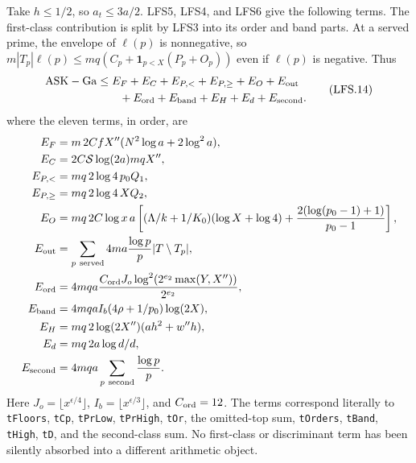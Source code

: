 Take $h\le1/2$, so $a_t\le3a/2$.  LFS5, LFS4, and LFS6
give the following terms.  The first-class contribution is split
by LFS3 into its order and band parts.  At a served prime, the
envelope of $\ell(p)$ is nonnegative, so
$m|T_p|\ell(p)\le mq(C_p+\mathbf1_{p<X}(P_p+O_p))$ even
if $\ell(p)$ is negative.  Thus
\begin{equation}
\begin{aligned}
 \mathrm{ASK}-\mathrm{Ga}
 &\le E_F+E_C+E_{P,<}+E_{P,\ge}+E_O+E_{\rm out}\\
 &\qquad{}+E_{\rm ord}+E_{\rm band}+E_H+E_d+E_{\rm second}.
\end{aligned}                                               \tag{LFS.14}
\end{equation}
where the eleven terms, in order, are
\begin{align*}
 E_F&=m\,2CfX''(N^2\log a+2\log^2a),\\
 E_C&=2C\mathcal S\log(2a)mqX'',\\
 E_{P,<}&=mq\,2\log4\,p_0Q_1,\\
 E_{P,\ge}&=mq\,2\log4\,XQ_2,\\
 E_O&=mq\,2C\log x\,a
 \left[(\Lambda/k+1/K_0)(\log X+\log4)
       +\frac{2(\log(p_0-1)+1)}{p_0-1}\right],\\
 E_{\rm out}&=\sum_{p\ {\rm served}}4ma\frac{\log p}{p}|T\setminus T_p|,\\
 E_{\rm ord}&=4mqa\frac{C_{\rm ord}J_o
                       \log^2(2^{e_2}\max(Y,X''))}{2^{e_2}},\\
 E_{\rm band}&=4mqaI_b(4\rho+1/p_0)\log(2X),\\
 E_H&=mq\,2\log(2X'')(ah^2+w''h),\\
 E_d&=mq\,2a\log d/d,\\
 E_{\rm second}&=4mqa\sum_{p\ {\rm second}}\frac{\log p}{p}.
\end{align*}
Here $J_o=\lfloor x^{\epsilon/4}\rfloor$,
$I_b=\lfloor x^{\epsilon/3}\rfloor$, and $C_{\rm ord}=12$.
The terms correspond literally to
\texttt{tFloors}, \texttt{tCp}, \texttt{tPrLow},
\texttt{tPrHigh}, \texttt{tOr}, the omitted-top sum,
\texttt{tOrders}, \texttt{tBand}, \texttt{tHigh},
\texttt{tD}, and the second-class sum.  No first-class or
discriminant term has been silently absorbed into a different
arithmetic object.

